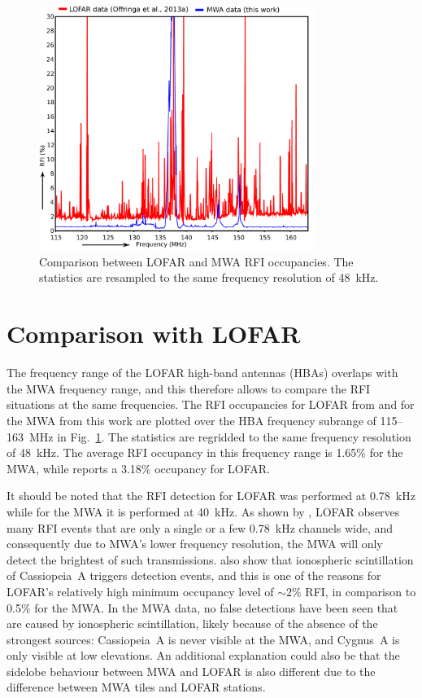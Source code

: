 \documentclass{pasa}
\begin{document}
\noindent\begin{figure}
\begin{center}\hspace*{-0.2cm}\includegraphics[width=9cm]{img/LOFAR-MWA-occupancy}
\caption{Comparison between LOFAR and MWA RFI occupancies. The statistics are resampled to the same frequency resolution of 48~kHz. }
\label{fig:lofar-mwa-occupancy}
\end{center}
\end{figure}

\section{Comparison with LOFAR} \label{ch:lofar-comparison}
The frequency range of the LOFAR high-band antennas (HBAs) overlaps with the MWA frequency range, and this therefore allows to compare the RFI situations at the same frequencies. The RFI occupancies for LOFAR from  and for the MWA from this work are plotted over the HBA frequency subrange of 115--163~MHz in Fig.~\ref{fig:lofar-mwa-occupancy}. The statistics are regridded to the same frequency resolution of 48~kHz. The average RFI occupancy in this frequency range is 1.65\% for the MWA, while  reports a 3.18\% occupancy for LOFAR.

It should be noted that the RFI detection for LOFAR was performed at 0.78~kHz while for the MWA it is performed at 40~kHz. As shown by , LOFAR observes many RFI events that are only a single or a few 0.78~kHz channels wide, and consequently due to MWA's lower frequency resolution, the MWA will only detect the brightest of such transmissions.  also show that ionospheric scintillation of Cassiopeia~A triggers detection events, and this is one of the reasons for LOFAR's relatively high minimum occupancy level of $\sim2\%$ RFI, in comparison to 0.5\% for the MWA. In the MWA data, no false detections have been seen that are caused by ionospheric scintillation, likely because of the absence of the strongest sources: Cassiopeia~A is never visible at the MWA, and Cygnus~A is only visible at low elevations. An additional explanation could also be that the sidelobe behaviour between MWA and LOFAR is also different due to the difference between MWA tiles and LOFAR stations.
\end{document}
